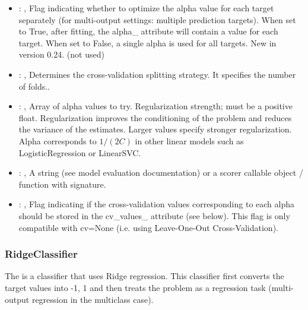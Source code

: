 \begin{itemize}
    \item {}: , 
      Flag indicating whether to optimize the alpha value for each target separately
      (for multi-output settings: multiple prediction targets). When set to True, after fitting,
      the alpha\_ attribute will contain a value for each target. When set to False, a single alpha
      is used for all targets. New in version 0.24. (not used)

    \item {}: , 
      Determines the cross-validation splitting strategy.
      It specifies the number of folds..

    \item {}: , 
      Array of alpha values to try. Regularization strength; must be a positive float.
      Regularization                                                  improves the conditioning of
      the problem and reduces the variance of the estimates.
      Larger values specify stronger regularization. Alpha corresponds to $1 / (2C)$ in other
      linear models such as LogisticRegression or LinearSVC.

    \item {}: , 
      A string (see model evaluation documentation) or a scorer
      callable object / function with signature.

    \item {}: , 
      Flag indicating if the cross-validation values corresponding
      to each alpha should be stored in the cv\_values\_ attribute (see below).
      This flag is only compatible with cv=None (i.e. using Leave-One-Out
      Cross-Validation).
  \end{itemize}


\subsubsection{RidgeClassifier}
  The  is a classifier that uses Ridge regression.
  This classifier first converts the target values into {-1, 1} and then treats
  the problem as a regression task (multi-output regression in the multiclass case).

